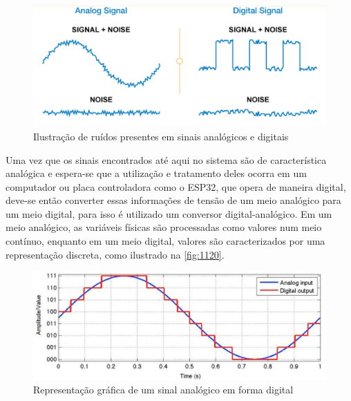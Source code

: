 \begin{figure}[htb]
	\caption{\label{fig:1110} Ilustração de ruídos presentes em sinais analógicos e digitais}
	\begin{center}
		\includegraphics[width=\textwidth]{pictures/1110.png}
	\end{center}
\end{figure}

Uma vez que os sinais encontrados até aqui no sistema são de característica analógica e espera-se que a utilização e tratamento deles ocorra em um computador ou placa
controladora como o ESP32, que opera de maneira digital, deve-se então converter essas informações de tensão de um meio analógico para um meio digital, para isso é utilizado
um conversor digital-analógico.
Em um meio analógico, as variáveis físicas são processadas como valores num meio contínuo, enquanto em um meio digital, valores são caracterizados por uma representação
discreta, como ilustrado na \autoref{fig:1120}.

\begin{figure}[htb]
	\caption{\label{fig:1120} Representação gráfica de um sinal analógico em forma digital}
	\begin{center}
		\includegraphics[width=\textwidth]{pictures/1120.png}
	\end{center}
\end{figure}

